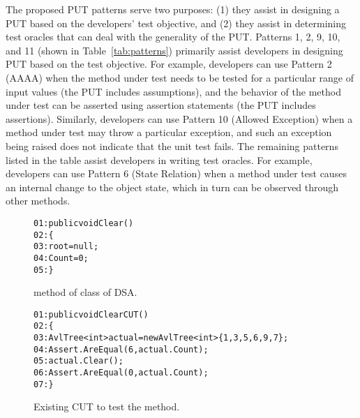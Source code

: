The proposed PUT patterns serve two purposes: (1) they assist in designing a PUT based on the developers' test objective, and (2) they assist in determining test oracles that can deal with the generality of the PUT. Patterns 1, 2, 9, 10, and 11 (shown in Table~\ref{tab:patterns}) primarily assist developers in designing PUT based on the test objective. For example, developers can use Pattern 2 (AAAA) when the method under test needs to be tested for a particular range of input values (the PUT includes assumptions), and the behavior of the method under test can be asserted using assertion statements (the PUT includes assertions). Similarly, developers can use Pattern 10 (Allowed Exception) when a method under test may throw a particular exception, and such an exception being raised does not indicate that the unit test fails. 
The remaining patterns listed in the table assist developers in writing test oracles. For example, developers can use Pattern 6 (State Relation) when a method under test causes an internal change to the object state, which in turn can be observed through other methods. 

\begin{figure}
\begin{CodeOut}        
\begin{alltt}
01: public void Clear()
02: \{
03: \hspace{0.07in}root = null;
04: \hspace{0.07in}Count = 0;
05: \}
\end{alltt}        
\end{CodeOut}\vspace*{-4ex}
\caption{ method of  class of DSA.}
\label{fig:pattern}%

\begin{CodeOut}        
\begin{alltt}
01: public void ClearCUT()
02: \{
03: \hspace{0.07in}AvlTree<int> actual = new AvlTree<int> \{ 1,3,5,6,9,7 \};
04: \hspace{0.07in}Assert.AreEqual(6, actual.Count);
05: \hspace{0.07in}actual.Clear();
06: \hspace{0.07in}Assert.AreEqual(0, actual.Count);            
07: \}
\end{alltt}
\end{CodeOut}\vspace*{-4ex}
\caption{Existing CUT to test the  method.}%
\label{fig:patternCUT}%
\end{figure}

